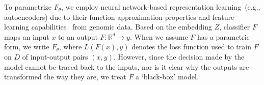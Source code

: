 \hspace*{3.5mm} To parametrize $F_{\theta}$, we employ neural network-based representation learning~(e.g., autoencoders) due to their function approximation properties and feature learning capabilities~\cite{xie2016unsupervised} from genomic data. Based on the embedding $Z$, classifier $F$ maps an input $x$ to an output $F: \mathbb{R}^{d} \mapsto y$. When we assume $F$ has a parametric form, we write $F_{\theta}$, where ${L}(F(x), y)$ denotes the loss function used to train $F$ on $D$ of input-output pairs $(x,y)$. However, since the decision made by the model cannot be traced back to the inputs, nor is it clear why the outputs are transformed the way they are, we treat $F$ a `black-box' model. 

